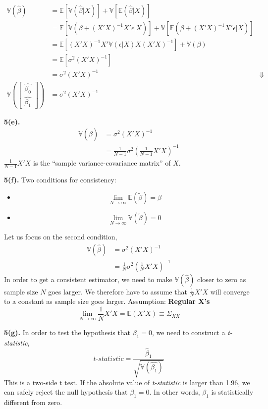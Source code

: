 \documentclass[UTF8]{ctexart}
\begin{document}
\begin{align*}
    \mathbb{V}(\hat{\beta})&=\mathbb{E}[\mathbb{V}(\hat{\beta}|X)]+
    \mathbb{V}[\mathbb{E}(\hat{\beta}|X)] \\
    &=\mathbb{E}[\mathbb{V}(\beta+(X'X)^{-1}X'\epsilon|X)]+
    \mathbb{V}[\mathbb{E}(\beta+(X'X)^{-1}X'\epsilon|X)]\\
    &=\mathbb{E}[(X'X)^{-1}X'\mathbb{V}(\epsilon|X)X(X'X)^{-1}]+
    \mathbb{V}(\beta) \\
    &=\mathbb{E}[\sigma^2(X'X)^{-1}]\\
    &=\sigma^2(X'X)^{-1}
    &\Downarrow \\
    \mathbb{V}\left(
    \begin{bmatrix}
        \hat{\beta_0} \\
        \hat{\beta_1}
    \end{bmatrix}\right)
    &=\sigma^2(X'X)^{-1}
\end{align*}
\bigskip

\textbf{5(e).}
\begin{align*}
    \mathbb{V}(\hat{\beta})&=\sigma^2(X'X)^{-1} \\
    &=\frac{1}{N-1}\sigma^2(\frac{1}{N-1}X'X)^{-1}
\end{align*}
$\frac{1}{N-1}X'X$ is the ``sample variance-covariance matrix'' of $X$.
\bigskip 

\textbf{5(f).}\newline
Two conditions for consistency:
\begin{itemize}
    \item \[\lim_{N \to \infty}\mathbb{E}(\tilde{\beta})=\beta \] 
    \item \[\lim_{N \to \infty}\mathbb{V}(\tilde{\beta})=0 \]  
\end{itemize}
Let us focus on the second condition,
\begin{align*}
    \mathbb{V}(\hat{\beta})&=\sigma^2(X'X)^{-1} \\
    &=\frac{1}{N}\sigma^2(\frac{1}{N}X'X)^{-1}
\end{align*}
In order to get a consistent estimator, we need to make $\mathbb{V}(\hat{\beta})$ closer to zero 
as sample size $N$ goes larger. We therefore have to assume that 
$\frac{1}{N}X'X$ will converge to a constant as sample size goes larger.\newline
Assumption: \textbf{Regular X's}
\[\lim_{N \to \infty}\frac{1}{N}X'X=\mathbb{E}(X'X)\equiv \Sigma_{XX} \] 
\bigskip

\textbf{5(g).}\newline 
In order to test the hypothesis that $\beta_1=0$, we need to construct a \textit{t-statistic},
\[\textit{t-statistic}=\frac{\hat{\beta}_1}{\sqrt{\mathbb{V}(\hat{\beta_1})}} \] 
This is a two-side t test. If the absolute value of \textit{t-statistic} 
is larger than 1.96, we can safely reject the null hypothesis that $\beta_1=0$. 
In other words, $\beta_1$ is statistically different from zero.
\bigskip
\end{document}
